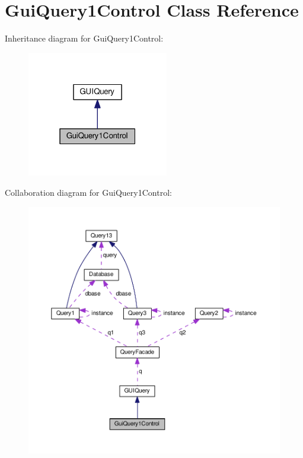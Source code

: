 \hypertarget{classGuiQuery1Control}{}\section{Gui\+Query1\+Control Class Reference}
\label{classGuiQuery1Control}


Inheritance diagram for Gui\+Query1\+Control\+:\nopagebreak
\begin{figure}[H]
\begin{center}
\leavevmode
\includegraphics[width=175pt]{classGuiQuery1Control__inherit__graph}
\end{center}
\end{figure}


Collaboration diagram for Gui\+Query1\+Control\+:\nopagebreak
\begin{figure}[H]
\begin{center}
\leavevmode
\includegraphics[width=350pt]{classGuiQuery1Control__coll__graph}
\end{center}
\end{figure}
